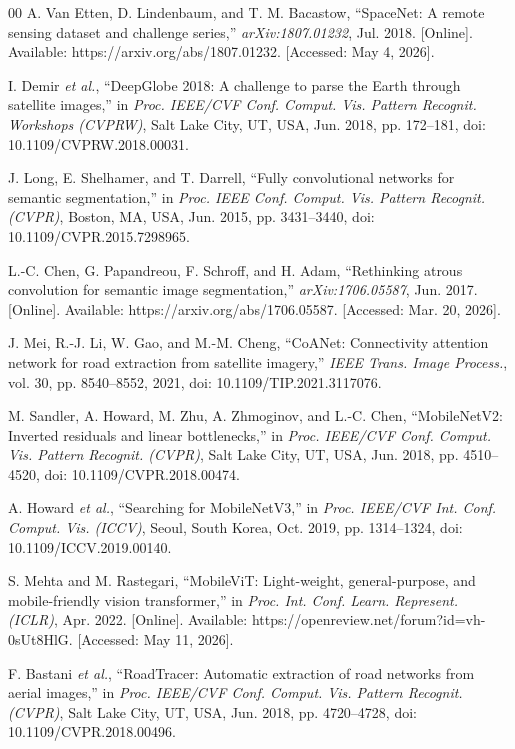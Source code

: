 \documentclass{ieeeaccess}
\begin{document}
\begin{thebibliography}{00}
A. Van Etten, D. Lindenbaum, and T. M. Bacastow, ``SpaceNet: A remote sensing dataset and challenge series,'' \emph{arXiv:1807.01232}, Jul. 2018. [Online]. Available: https://arxiv.org/abs/1807.01232. [Accessed: May 4, 2026].

I. Demir \emph{et al.}, ``DeepGlobe 2018: A challenge to parse the Earth through satellite images,'' in \emph{Proc. IEEE/CVF Conf. Comput. Vis. Pattern Recognit. Workshops (CVPRW)}, Salt Lake City, UT, USA, Jun. 2018, pp. 172--181, doi: 10.1109/CVPRW.2018.00031.

J. Long, E. Shelhamer, and T. Darrell, ``Fully convolutional networks for semantic segmentation,'' in \emph{Proc. IEEE Conf. Comput. Vis. Pattern Recognit. (CVPR)}, Boston, MA, USA, Jun. 2015, pp. 3431--3440, doi: 10.1109/CVPR.2015.7298965.

L.-C. Chen, G. Papandreou, F. Schroff, and H. Adam, ``Rethinking atrous convolution for semantic image segmentation,'' \emph{arXiv:1706.05587}, Jun. 2017. [Online]. Available: https://arxiv.org/abs/1706.05587. [Accessed: Mar. 20, 2026].

J. Mei, R.-J. Li, W. Gao, and M.-M. Cheng, ``CoANet: Connectivity attention network for road extraction from satellite imagery,'' \emph{IEEE Trans. Image Process.}, vol. 30, pp. 8540--8552, 2021, doi: 10.1109/TIP.2021.3117076.

M. Sandler, A. Howard, M. Zhu, A. Zhmoginov, and L.-C. Chen, ``MobileNetV2: Inverted residuals and linear bottlenecks,'' in \emph{Proc. IEEE/CVF Conf. Comput. Vis. Pattern Recognit. (CVPR)}, Salt Lake City, UT, USA, Jun. 2018, pp. 4510--4520, doi: 10.1109/CVPR.2018.00474.

A. Howard \emph{et al.}, ``Searching for MobileNetV3,'' in \emph{Proc. IEEE/CVF Int. Conf. Comput. Vis. (ICCV)}, Seoul, South Korea, Oct. 2019, pp. 1314--1324, doi: 10.1109/ICCV.2019.00140.

S. Mehta and M. Rastegari, ``MobileViT: Light-weight, general-purpose, and mobile-friendly vision transformer,'' in \emph{Proc. Int. Conf. Learn. Represent. (ICLR)}, Apr. 2022. [Online]. Available: https://openreview.net/forum?id=vh-0sUt8HlG. [Accessed: May 11, 2026].

F. Bastani \emph{et al.}, ``RoadTracer: Automatic extraction of road networks from aerial images,'' in \emph{Proc. IEEE/CVF Conf. Comput. Vis. Pattern Recognit. (CVPR)}, Salt Lake City, UT, USA, Jun. 2018, pp. 4720--4728, doi: 10.1109/CVPR.2018.00496.


\end{thebibliography}
\end{document}

